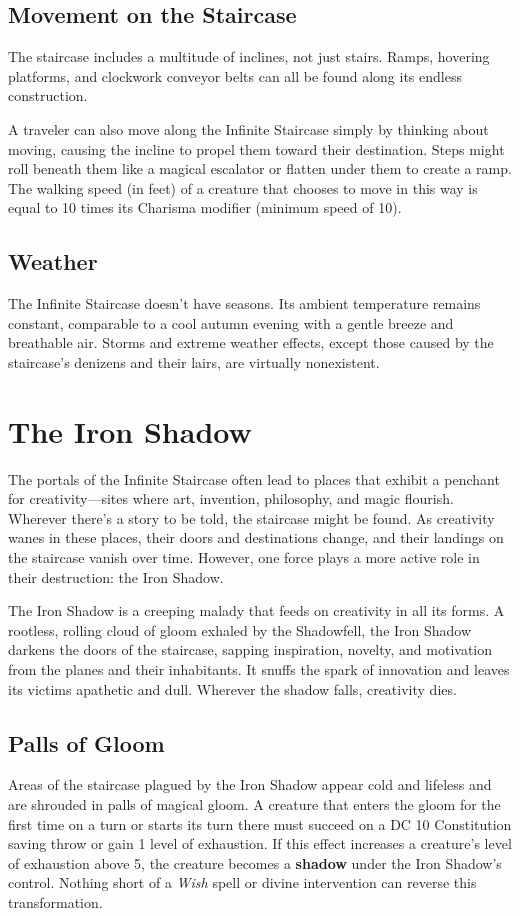 \documentclass[10pt,a4paper,twoside,bg=print,twocolumn,openany,nodeprecatedcode]{dndbook}
\begin{document}
\subsection{Movement on the Staircase}
The staircase includes a multitude of inclines, not just stairs. Ramps, hovering platforms, and clockwork conveyor belts can all be found along its endless construction.

A traveler can also move along the Infinite Staircase simply by thinking about moving, causing the incline to propel them toward their destination. Steps might roll beneath them like a magical escalator or flatten under them to create a ramp. The walking speed (in feet) of a creature that chooses to move in this way is equal to 10 times its Charisma modifier (minimum speed of 10).

\subsection{Weather}
The Infinite Staircase doesn't have seasons. Its ambient temperature remains constant, comparable to a cool autumn evening with a gentle breeze and breathable air. Storms and extreme weather effects, except those caused by the staircase's denizens and their lairs, are virtually nonexistent.

\section{The Iron Shadow}
The portals of the Infinite Staircase often lead to places that exhibit a penchant for creativity—sites where art, invention, philosophy, and magic flourish. Wherever there's a story to be told, the staircase might be found. As creativity wanes in these places, their doors and destinations change, and their landings on the staircase vanish over time. However, one force plays a more active role in their destruction: the Iron Shadow.

The Iron Shadow is a creeping malady that feeds on creativity in all its forms. A rootless, rolling cloud of gloom exhaled by the Shadowfell, the Iron Shadow darkens the doors of the staircase, sapping inspiration, novelty, and motivation from the planes and their inhabitants. It snuffs the spark of innovation and leaves its victims apathetic and dull. Wherever the shadow falls, creativity dies.

\subsection{Palls of Gloom}
Areas of the staircase plagued by the Iron Shadow appear cold and lifeless and are shrouded in palls of magical gloom. A creature that enters the gloom for the first time on a turn or starts its turn there must succeed on a DC 10 Constitution saving throw or gain 1 level of exhaustion. If this effect increases a creature's level of exhaustion above 5, the creature becomes a \textbf{shadow} under the Iron Shadow's control. Nothing short of a \textit{Wish} spell or divine intervention can reverse this transformation.
\end{document}
